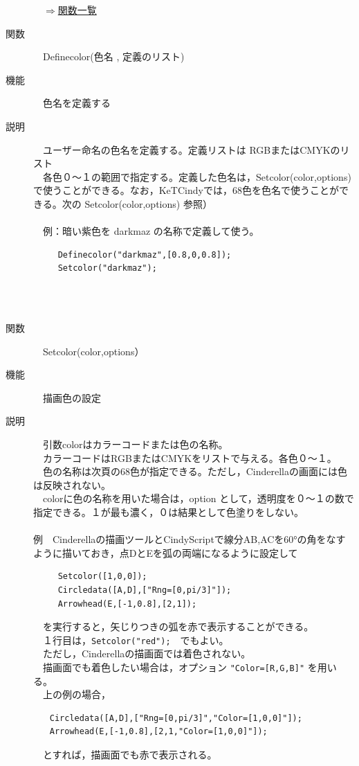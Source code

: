 \documentclass[papersize,a4paper,12pt,uplatex]{jsarticle}
\begin{document}
\begin{description}
\begin{flushright}　\hyperlink{functionlist}{$\Rightarrow$関数一覧}\end{flushright}
\newpage
\hypertarget{definecolor}{}
\item[関数]　Definecolor(色名 , 定義のリスト)
\item[機能]　色名を定義する
\item[説明]　ユーザー命名の色名を定義する。定義リストは RGBまたはCMYKのリスト\\
　各色０〜１の範囲で指定する。定義した色名は，Setcolor(color,options)　で使うことができる。なお，KeTCindyでは，68色を色名で使うことができる。次の Setcolor(color,options) 参照）\\
　\\
　例：暗い紫色を darkmaz の名称で定義して使う。
\begin{verbatim}
　　　Definecolor("darkmaz",[0.8,0,0.8]);
　　　Setcolor("darkmaz");
\end{verbatim}
\hypertarget{setcolor}{}
　\\
　\\
\item[関数]　Setcolor(color,options）
\item[機能]　描画色の設定
\item[説明]　引数colorはカラーコードまたは色の名称。\\
　カラーコードはRGBまたはCMYKをリストで与える。各色０〜１。\\
　色の名称は次頁の68色が指定できる。ただし，Cinderellaの画面には色は反映されない。\\
　colorに色の名称を用いた場合は，option として，透明度を０〜１の数で指定できる。１が最も濃く，０は結果として色塗りをしない。\\
　\\
例　Cinderellaの描画ツールとCindyScriptで線分AB,ACを60°の角をなすように描いておき，点DとEを弧の両端になるように設定して
\begin{verbatim}
　　　Setcolor([1,0,0]);
　　　Circledata([A,D],["Rng=[0,pi/3]"]);
　　　Arrowhead(E,[-1,0.8],[2,1]);
\end{verbatim}
　を実行すると，矢じりつきの弧を赤で表示することができる。\\
　１行目は，\verb|Setcolor("red");|　でもよい。\\
　ただし，Cinderellaの描画面では着色されない。\\
　描画面でも着色したい場合は，オプション \verb|"Color=[R,G,B]"| を用いる。\\
　上の例の場合，
\begin{verbatim}
　　Circledata([A,D],["Rng=[0,pi/3]","Color=[1,0,0]"]);
　　Arrowhead(E,[-1,0.8],[2,1,"Color=[1,0,0]"]);
\end{verbatim}
　とすれば，描画面でも赤で表示される。\\


\end{description}
\end{document}
